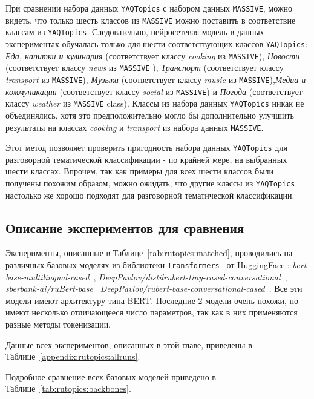 При сравнении набора данных \texttt{YAQTopics} с набором данных \texttt{MASSIVE}, можно видеть, что только шесть классов из \texttt{MASSIVE} можно поставить в соответствие классам из  \texttt{YAQTopics}. Следовательно, нейросетевая модель в данных экспериментах обучалась только для шести соответствующих классов \texttt{YAQTopics}: \textit{Еда, напитки и кулинария} (соответствует классу \textit{cooking} из \texttt{MASSIVE}), \textit{Новости} (соответствует классу \textit{news} из \texttt{MASSIVE} ), \textit{Транспорт} (соответствует классу \textit{transport} из \texttt{MASSIVE}), \textit{Музыка} (соответствует классу \textit{music} из \texttt{MASSIVE}),\textit{Медиа и коммуникации} (соответствует классу \textit{social} из \texttt{MASSIVE}) и \textit{Погода} (соответствует классу \textit{weather} из \texttt{MASSIVE} class). Классы из набора данных \texttt{YAQTopics} никак не объединялись, хотя это предположительно могло бы дополнительно улучшить результаты на классах \textit{cooking} и \textit{transport} из набора данных \texttt{MASSIVE}. 

Этот метод позволяет проверить пригодность набора данных \texttt{YAQTopics} для разговорной тематической классификации - по крайней мере, на выбранных шести классах. Впрочем, так как примеры для всех шести классов были получены похожим образом, можно ожидать, что другие классы из \texttt{YAQTopics} настолько же хорошо подходят для разговорной тематической классификации. 

\subsection{Описание экспериментов для сравнения}
Эксперименты, описанные в Таблице~\ref{tab:rutopics:matched}, проводились на различных базовых моделях из библиотеки \texttt{Transformers}~\cite{huggingface_transformers} от HuggingFace : \textit{bert-base-multilingual-cased}~\cite{multilingual_bert}, \textit{DeepPavlov/distilrubert-tiny-cased-conversational}~\cite{distilrubert}, \textit{sberbank-ai/ruBert-base}~\cite{sbert_base}  \textit{DeepPavlov/rubert-base-conversational-cased}~\cite{rubert}. Все эти модели имеют архитектуру типа BERT. Последние 2 модели очень похожи, но имеют несколько отличающееся число параметров, так как в них применяются разные методы токенизации. 

Данные всех экспериментов, описанных в этой главе, приведены в Таблице~\ref{appendix:rutopics:allruns}. 

Подробное сравнение всех базовых моделей приведено в Таблице~\ref{tab:rutopics:backbones}.

